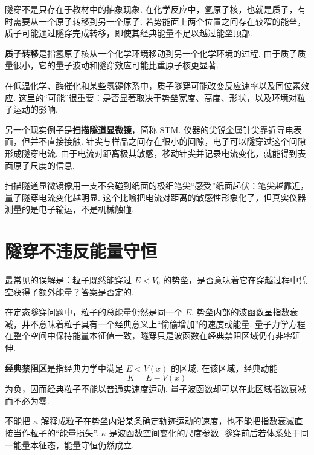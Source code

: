 \documentclass[UTF8,11pt,a4paper,openany]{ctexbook}
\newcommand{\term}[1]{\textbf{#1}}
\begin{document}
隧穿不是只存在于教材中的抽象现象. 在化学反应中，氢原子核，也就是质子，有时需要从一个原子转移到另一个原子. 若势能面上两个位置之间存在较窄的能垒，质子可能通过隧穿完成转移，即使其经典能量不足以越过能垒顶部. 

\begin{notationbox}
\term{质子转移}是指氢原子核从一个化学环境移动到另一个化学环境的过程. 由于质子质量很小，它的量子波动和隧穿效应可能比重原子核更显著. 
\end{notationbox}

在低温化学、酶催化和某些氢键体系中，质子隧穿可能改变反应速率以及同位素效应. 这里的“可能”很重要：是否显著取决于势垒宽度、高度、形状，以及环境对粒子运动的影响. 

另一个现实例子是\term{扫描隧道显微镜}，简称 STM. 仪器的尖锐金属针尖靠近导电表面，但并不直接接触. 针尖与样品之间存在很小的间隙，电子可以隧穿过这个间隙形成隧穿电流. 由于电流对距离极其敏感，移动针尖并记录电流变化，就能得到表面原子尺度的信息. 

\begin{analogybox}
扫描隧道显微镜像用一支不会碰到纸面的极细笔尖“感受”纸面起伏：笔尖越靠近，量子隧穿电流变化越明显. 这个比喻把电流对距离的敏感性形象化了，但真实仪器测量的是电子输运，不是机械触碰. 
\end{analogybox}

\section{隧穿不违反能量守恒}

最常见的误解是：粒子既然能穿过 $E<V_0$ 的势垒，是否意味着它在穿越过程中凭空获得了额外能量？答案是否定的. 

在定态隧穿问题中，粒子的总能量仍然是同一个 $E$. 势垒内部的波函数呈指数衰减，并不意味着粒子具有一个经典意义上“偷偷增加”的速度或能量. 量子力学方程在整个空间中保持能量本征值一致，隧穿只是波函数在经典禁阻区域仍有非零延伸. 

\begin{definitionbox}
\term{经典禁阻区}是指经典力学中满足 $E<V(x)$ 的区域. 在该区域，经典动能
\[
K=E-V(x)
\]
为负，因而经典粒子不能以普通实速度运动. 量子波函数却可以在此区域指数衰减而不必为零. 
\end{definitionbox}

\begin{limitbox}
不能把 $\kappa$ 解释成粒子在势垒内沿某条确定轨迹运动的速度，也不能把指数衰减直接当作粒子的“能量损失”. $\kappa$ 是波函数空间变化的尺度参数. 隧穿前后若体系处于同一能量本征态，能量守恒仍然成立. 
\end{limitbox}
\end{document}
